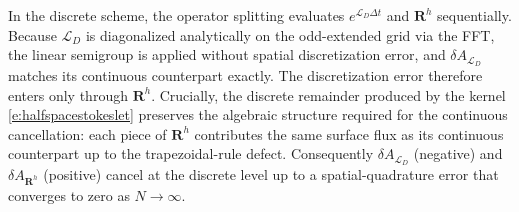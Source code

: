 \documentclass{amsart}
\newcommand{\mX}{\mathbf{X}}
\begin{document}

In the discrete scheme, the operator splitting evaluates $e^{\mathcal{L}_D \Delta t}$ and $\mathbf{R}^h$ sequentially.  Because $\mathcal{L}_D$ is diagonalized analytically on the odd-extended grid via the FFT, the linear semigroup is applied without spatial discretization error, and $\delta A_{\mathcal{L}_D}$ matches its continuous counterpart exactly.  The discretization error therefore enters only through $\mathbf{R}^h$.  Crucially, the discrete remainder produced by the kernel \eqref{e:halfspacestokeslet} preserves the algebraic structure required for the continuous cancellation: each piece of $\mathbf{R}^h$ contributes the same surface flux as its continuous counterpart up to the trapezoidal-rule defect.  Consequently $\delta A_{\mathcal{L}_D}$ (negative) and $\delta A_{\mathbf{R}^h}$ (positive) cancel at the discrete level up to a spatial-quadrature error that converges to zero as $N\to\infty$.



\end{document}

